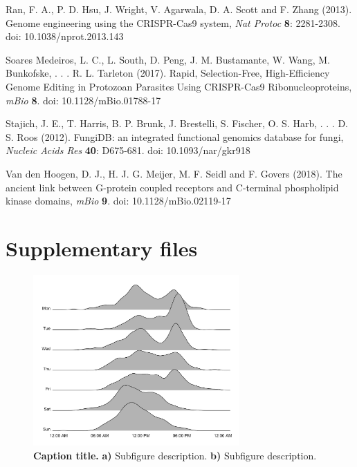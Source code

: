 \documentclass[onecolumn, 11pt,openany]{memoir}
\begin{document}
\begin{multicols}{2}
\begin{sloppy}
\begin{footnotesize}
Ran, F. A., P. D. Hsu, J. Wright, V. Agarwala, D. A. Scott and F. Zhang (2013). Genome engineering using the CRISPR-Cas9 system, \textit{Nat Protoc} \textbf{8}: 2281-2308. doi: 10.1038/nprot.2013.143

Soares Medeiros, L. C., L. South, D. Peng, J. M. Bustamante, W. Wang, M. Bunkofske, . . . R. L. Tarleton (2017). Rapid, Selection-Free, High-Efficiency Genome Editing in Protozoan Parasites Using CRISPR-Cas9 Ribonucleoproteins, \textit{mBio} \textbf{8}. doi: 10.1128/mBio.01788-17

Stajich, J. E., T. Harris, B. P. Brunk, J. Brestelli, S. Fischer, O. S. Harb, . . . D. S. Roos (2012). FungiDB: an integrated functional genomics database for fungi, \textit{Nucleic Acids Res} \textbf{40}: D675-681. doi: 10.1093/nar/gkr918

Van den Hoogen, D. J., H. J. G. Meijer, M. F. Seidl and F. Govers (2018). The ancient link between G-protein coupled receptors and C-terminal phospholipid kinase domains, \textit{mBio} \textbf{9}. doi: 10.1128/mBio.02119-17

\end{footnotesize}
\end{sloppy}
\end{multicols}

\clearpage

\section{Supplementary files}
\makeatletter 
\setcounter{figure}{0}
\renewcommand{\thetable}{S\arabic{table}}   
\renewcommand{\thefigure}{S\arabic{figure}}
\renewcommand{\figurename}{Supplemental Figure}
\renewcommand{\tablename}{Supplemental Table}

\begin{figure}[h]
\centering
\includegraphics[width=0.7\textwidth]{Figures/FigS1}
\caption{\textbf{Caption title.} \textbf{a)} Subfigure description. \textbf{b)} Subfigure description.}
\label{figS1_detection}
\end{figure}
\end{document}
